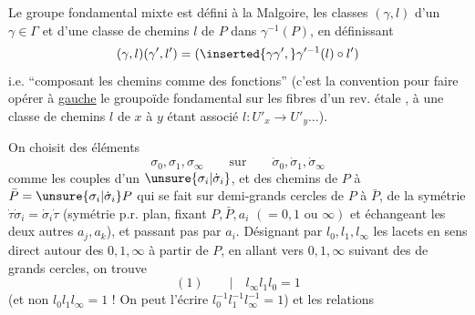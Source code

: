 Le groupe fondamental mixte est défini à la Malgoire,  les classes $(\gamma,l)$ d'un $\gamma\in\Gamma$ et d'une classe de chemins $l$ de $P$ dans $\gamma^{-1}(P)$, en définissant
\[
(\gamma,l)(\gamma',l')=(\inserted{\gamma\gamma',}\gamma'^{-1}(l)\circ l')
\]
i.e. ``composant les chemins comme des fonctions'' (c'est la convention pour faire opérer à \uline{gauche} le groupoïde fondamental sur les fibres d'un rev. étale , à une classe de chemins $l$ de $x$ à $y$ étant associé $l:U'_x\longrightarrow U'_y\ldots$).

On choisit des éléments
\[
\sigma_0,\sigma_1,\sigma_\infty\qquad\text{sur}\qquad\dot\sigma_0,\dot\sigma_1,\dot\sigma_\infty
\]
comme les couples d'un $\unsure{\sigma_i|\dot\sigma_i}$, et des chemins  de $P$ à $\bar P=\unsure{\sigma_i|\dot\sigma_i}P$ qui se fait sur   demi-grands cercles de $P$ à $\bar P$,    de la symétrie $\dot\tau\dot\sigma_i=\dot\sigma_i\dot\tau$ (symétrie p.r.  plan, fixant $P,\bar P,a_i$ $(=0,1\text{ ou }\infty)$ et échangeant les deux autres $a_j,a_k$), et  passant pas par $a_i$.  Désignant par $l_0,l_1,l_\infty$  les lacets en sens direct autour des $0,1,\infty$ à partir de $P$, en allant vers $0,1,\infty$ suivant des  de grands cercles, on trouve
\[
(1)\qquad\big|\quad l_\infty l_1l_0=1
\]
(et non $l_0l_1l_\infty=1$ !  On peut l'écrire $l_0^{-1}l_1^{-1}l_\infty^{-1}=1$)
et les relations
